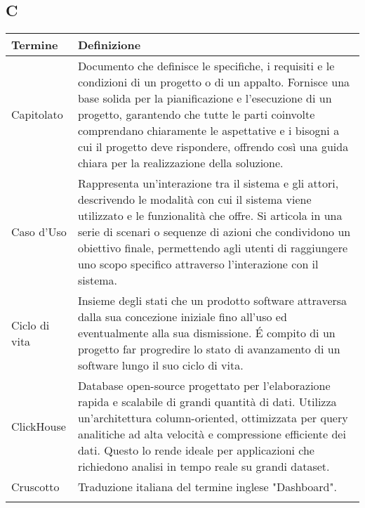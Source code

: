 \documentclass[10pt]{article}
\begin{document}
\subsection{C} %
\begin{tabularx}{\textwidth}{|>{\centering\arraybackslash}l|X|}
\hline
\rowcolor[gray]{0.8}
\textbf{Termine} & \textbf{Definizione}\\
\hline
Capitolato & Documento che definisce le specifiche, i requisiti e le condizioni di un progetto o di un appalto. Fornisce una base solida per la pianificazione e l’esecuzione di un progetto, garantendo che tutte le parti coinvolte comprendano chiaramente le aspettative e i bisogni a cui il progetto deve rispondere, offrendo così una guida chiara per la realizzazione della soluzione.\\
\hline
Caso d'Uso & Rappresenta un'interazione tra il sistema e gli attori, descrivendo le modalità con cui il sistema viene utilizzato e le funzionalità che offre. Si articola in una serie di scenari o sequenze di azioni che condividono un obiettivo finale, permettendo agli utenti di raggiungere uno scopo specifico attraverso l'interazione con il sistema.\\
\hline
Ciclo di vita & Insieme degli stati che un prodotto software attraversa dalla sua concezione iniziale fino all'uso ed eventualmente alla sua dismissione. \'E compito di un progetto far progredire lo stato di avanzamento di un software lungo il suo ciclo di vita.\\
\hline
ClickHouse & Database open-source progettato per l'elaborazione rapida e scalabile di grandi quantità di dati. Utilizza un'architettura column-oriented, ottimizzata per query analitiche ad alta velocità e compressione efficiente dei dati. Questo lo rende ideale per applicazioni che richiedono analisi in tempo reale su grandi dataset.\\
\hline
Cruscotto & Traduzione italiana del termine inglese "Dashboard".\\
\hline
 & \\
\hline
\end{tabularx}
\end{document}

